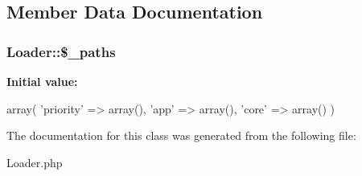 \subsection{Member Data Documentation}
\hypertarget{classLoader_ab18d27798c939ce8bd22c0146e129071}{
\subsubsection[{\$\_\-paths}]{\setlength{\rightskip}{0pt plus 5cm}Loader::\$\_\-paths}}
\label{classLoader_ab18d27798c939ce8bd22c0146e129071}
{\bfseries Initial value:}
\begin{DoxyCode}
 array(
                        'priority' => array(),
                        'app' => array(),
                        'core' => array()
                )
\end{DoxyCode}


The documentation for this class was generated from the following file:\begin{DoxyCompactItemize}
\item 
Loader.php\end{DoxyCompactItemize}
